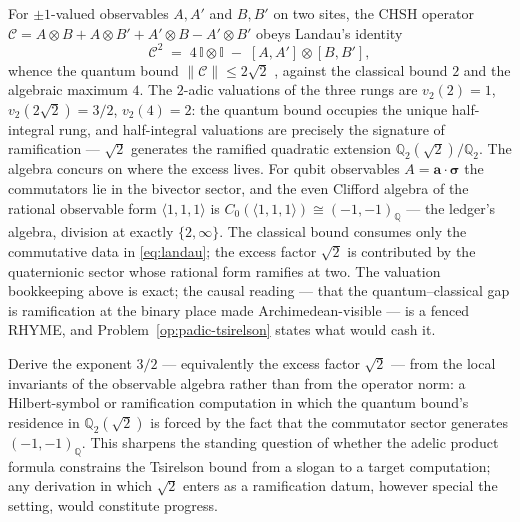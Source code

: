 For $\pm 1$-valued observables $A, A'$ and $B, B'$ on two sites, the CHSH operator
$\mathcal{C} = A \otimes B + A \otimes B' + A' \otimes B - A' \otimes B'$ obeys
Landau's identity
\begin{equation}
\mathcal{C}^{2} \;=\; 4\,\mathbb{I} \otimes \mathbb{I} \;-\; [A, A'] \otimes [B, B'],
\label{eq:landau}
\end{equation}
whence the quantum bound $\|\mathcal{C}\| \le 2\sqrt{2}$
\autocite{landau1987, tsirelson1980}, against the classical bound $2$
\autocite{chsh1969} and the algebraic maximum $4$. The $2$-adic valuations of the
three rungs are $v_2(2) = 1$, $v_2(2\sqrt{2}) = 3/2$, $v_2(4) = 2$: the quantum bound
occupies the unique half-integral rung, and half-integral valuations are precisely the
signature of ramification --- $\sqrt{2}$ generates the ramified quadratic extension
$\mathbb{Q}_2(\sqrt{2})/\mathbb{Q}_2$. The algebra concurs on where the excess lives.
For qubit observables $A = \mathbf{a} \cdot \boldsymbol{\sigma}$ the commutators lie
in the bivector sector, and the even Clifford algebra of the rational observable form
$\langle 1, 1, 1 \rangle$ is
$C_0(\langle 1,1,1 \rangle) \cong (-1,-1)_{\mathbb{Q}}$ \autocite{lam2005} --- the
ledger's algebra, division at exactly $\{2, \infty\}$. The classical bound consumes
only the commutative data in \eqref{eq:landau}; the excess factor $\sqrt{2}$ is
contributed by the quaternionic sector whose rational form ramifies at two. The
valuation bookkeeping above is exact; the causal reading --- that the
quantum--classical gap is ramification at the binary place made Archimedean-visible
--- is a fenced RHYME, and Problem~\ref{op:padic-tsirelson} states what would cash it.

\begin{openproblem}\label{op:padic-tsirelson}
Derive the exponent $3/2$ --- equivalently the excess factor $\sqrt{2}$ --- from the
local invariants of the observable algebra rather than from the operator norm: a
Hilbert-symbol or ramification computation in which the quantum bound's residence in
$\mathbb{Q}_2(\sqrt{2})$ is forced by the fact that the commutator sector generates
$(-1,-1)_{\mathbb{Q}}$. This sharpens the standing question of whether the adelic
product formula constrains the Tsirelson bound from a slogan to a target computation;
any derivation in which $\sqrt{2}$ enters as a ramification datum, however special the
setting, would constitute progress.
\end{openproblem}

